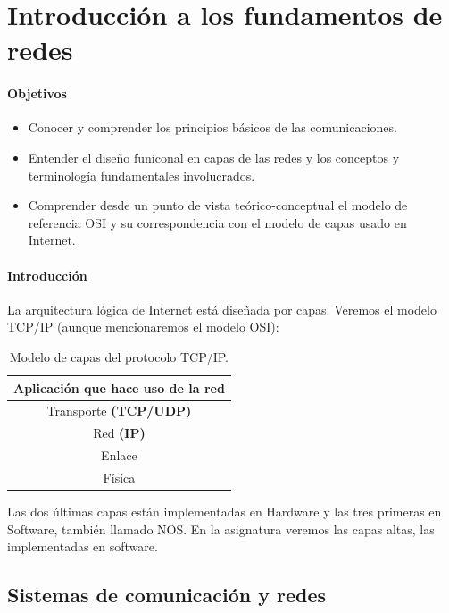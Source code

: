 \chapter{Introducción a los fundamentos de redes}
\subsubsection{Objetivos}
\begin{itemize}
    \item Conocer y comprender los principios básicos de las comunicaciones.
    \item Entender el diseño funiconal en capas de las redes y los conceptos y terminología fundamentales involucrados. 
    \item Comprender desde un punto de vista teórico-conceptual el modelo de referencia \acrshort{OSI} y su correspondencia con el modelo de capas usado en Internet.
\end{itemize}

\subsubsection{Introducción}
La arquitectura lógica de Internet está diseñada por capas. Veremos el modelo TCP/IP (aunque mencionaremos el modelo \acrshort{OSI}):
\begin{table}[h]
    \centering
    \begin{tabular}{|c|}
        \hline
        Aplicación que hace uso de la red\\ \hline
        Transporte \textbf{(TCP/UDP)} \\ \hline
        Red \textbf{(IP)} \\ \hline
        Enlace \\ \hline
        Física \\ \hline
    \end{tabular}
    \caption{Modelo de capas del protocolo TCP/IP.}
    \label{table:_tabla_de_capas}
\end{table}

Las dos últimas capas están implementadas en Hardware y las tres primeras en Software, también llamado \acrfull{NOS}. En la asignatura veremos las capas altas, las implementadas en software.

\section{Sistemas de comunicación y redes}

